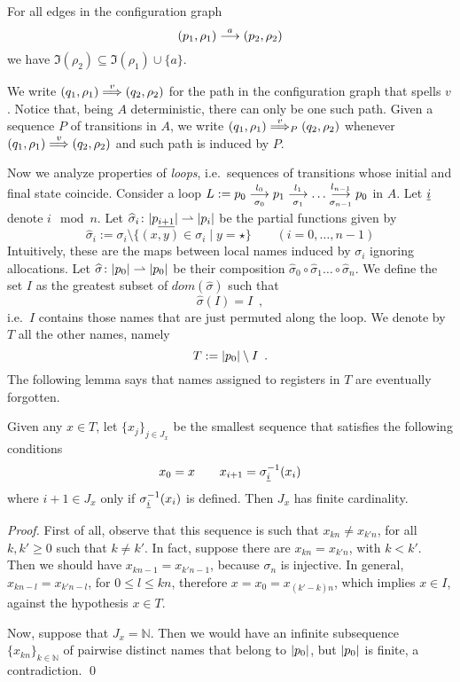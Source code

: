 \begin{lemma}
\label{lem:tr-names}
For all edges in the configuration graph
\[
	(p_1,\rho_1) \overset{a}{\longrightarrow} (p_2,\rho_2) 
\]
we have $\Im(\rho_2) \subseteq \Im(\rho_1) \cup \{ a \}$.
\end{lemma}
%
We write $(q_1,\rho_1) \overset{v}{\Longrightarrow} (q_2,\rho_2)$ for the path in the configuration graph that spells $v$. Notice that, being $A$ deterministic, there can only be one such path. Given a sequence $P$ of transitions in $A$, we write $(q_1,\rho_1) \overset{v}{\Longrightarrow}_{P} (q_2,\rho_2)$ whenever $(q_1,\rho_1) \overset{v}{\Longrightarrow} (q_2,\rho_2)$ and such path is induced by $P$.

Now we analyze properties of \emph{loops}, i.e.\ sequences of transitions whose initial and final state coincide. Consider a loop $L := p_0 \overset{l_0}{\underset{\sigma_0}{\longrightarrow}} p_1 \overset{l_1}{\underset{\sigma_1}{\longrightarrow}} \dots \overset{l_{n-1}}{\underset{\sigma_{n-1}}{\longrightarrow}} p_0$ in $A$. Let ${\underline{i}}$ denote $i \mod n$. Let $\widehat{\sigma}_i \colon |p_{\underline{i+1}}| \rightharpoonup |p_i|$ be the partial functions given by
\[
	\widehat{\sigma}_i := \sigma_i \setminus \{ (x,y) \in \sigma_i \mid y = \star \} 
	\qquad (i=0,\dots,n-1)
\]
Intuitively, these are the maps between local names induced by $\sigma_i$ ignoring allocations. Let $\widehat{\sigma} \colon |p_0| \rightharpoonup |p_0|$ be their composition $\widehat{\sigma}_0 \circ \widehat{\sigma}_1 \dots \circ \widehat{\sigma}_{n}$. We define the set $I$ as the greatest subset of $dom(\widehat{\sigma})$ such that
\[
	\widehat{\sigma}(I) = I \enspace ,
\]
i.e.\ $I$ contains those names that are just permuted along the loop. We denote by $T$ all the other names, namely 
\[
	T := |p_0| \setminus I \enspace .
\]
%
The following lemma says that names assigned to registers in $T$ are eventually forgotten.


\begin{lemma}
\label{lem:rho-forget}
Given any $x \in T$, let $\{x_j\}_{j \in J_x}$ be the smallest sequence that satisfies the following conditions
\[
	x_0 = x \qquad
	x_{i+1} = \sigma_{{\underline{i}}}^{-1}(x_i)
\]
where $i+1 \in J_x$ only if $\sigma_{{\underline{i}}}^{-1}(x_i)$ is defined. Then $J_x$ has finite cardinality.

\end{lemma}
\begin{proof}
First of all, observe that this sequence is such that $x_{kn} \neq x_{k'n}$, for all $k,k' \geq 0$ such that $k \neq k'$. In fact, suppose there are $x_{kn} = x_{k'n}$, with $k < k'$. Then we should have $x_{kn-1} = x_{k'n-1}$, because $\sigma_{n}$ is injective. In general, $x_{kn-l} = x_{k'n-l}$, for $0 \leq l \leq kn$, therefore $x = x_0 = x_{(k'-k)n}$, which implies $x \in I$, against the hypothesis $x \in T$.

Now, suppose that $J_x = \mathbb{N}$. Then we would have an infinite subsequence $\{x_{kn}\}_{k \in \mathbb{N}}$ of pairwise distinct names that belong to $|p_0|$, but $|p_0|$ is finite, a contradiction.
\qed
\end{proof}


